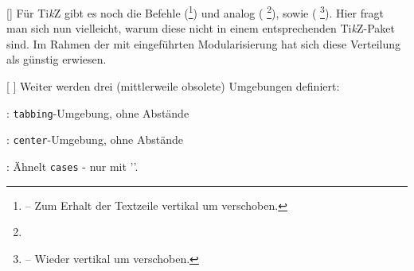 [\cmdlist {}\cmdlist {}]
Für Ti\textit{k}Z gibt es noch die Befehle  (\footnote{ -- Zum Erhalt der Textzeile vertikal um  verschoben.}) und analog\newline {} ( \footnote{}), sowie  ( \footnote{ -- Wieder vertikal um  verschoben.}). Hier fragt man sich nun vielleicht, warum diese nicht in einem entsprechenden Ti\textit{k}Z-Paket sind. Im Rahmen der mit  eingeführten Modularisierung hat sich diese Verteilung als günstig erwiesen. %

%
%
%

[\cmdlist {}\cmdlist {} \cmdold]
Weiter werden drei (mittlerweile obsolete) Umgebungen definiert: \begin{ditemize}\narrowitems
    \item {}:  \verb|tabbing|-Umgebung, ohne Abstände
    \item {}: \verb|center|-Umgebung, ohne Abstände
    \item {}: Ähnelt \verb|cases| - nur mit '\T{]}'.
\end{ditemize}

%
%
%

